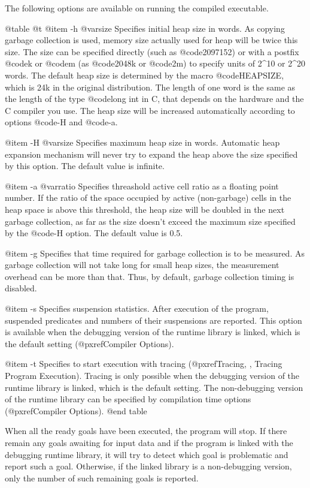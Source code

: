 {{{{The following options are available on running the compiled
executable.

@table @t
@item -h @var{size}
Specifies initial heap size in  words.  As copying garbage collection is
used, memory size actually used for heap will  be twice this  size.  The
size  can be specified  directly  (such  as  @code{2097152}) or  with  a
postfix @code{k} or  @code{m} (as @code{2048k} or @code{2m})  to specify
units of 2^10 or 2^20 words.  The default heap size is determined by the
macro @code{HEAPSIZE},  which is 24k in the original distribution.   The
length of one word is the same as the length of the type @code{long int}
in C, that depends on the hardware and the C compiler you use.  The heap
size will be increased automatically according  to options @code{-H} and
@code{-a}.

@item -H @var{size}
Specifies maximum heap size in words.  Automatic heap expansion
mechanism will never try to expand the heap above the size specified by
this option.  The default value is infinite.

@item -a @var{ratio}
Specifies threashold active cell ratio as a floating point number.  If
the ratio of the space occupied by active (non-garbage) cells in the
heap space is above this threshold, the heap size will be doubled in the
next garbage collection, as far as the size doesn't exceed the maximum
size specified by the @code{-H} option.  The default value is
0.5.

@item -g
Specifies that time required for garbage collection is to be measured.
As garbage collection will not take long for small heap sizes, the
measurement overhead can be more than that.  Thus, by default, garbage
collection timing is disabled.

@item -s
Specifies suspension statistics.  After execution of the program,
suspended predicates and numbers of their suspensions are reported.
This option is available when the debugging version of the runtime
library is linked, which is the default setting (@pxref{Compiler
Options}).

@item -t
Specifies to start execution with tracing (@pxref{Tracing, , Tracing
Program Execution}).  Tracing is only possible when the debugging
version of the runtime library is linked, which is the default setting.
The non-debugging version of the runtime library can be specified by
compilation time options (@pxref{Compiler Options}).
@end table

When all the ready goals have been executed, the program will stop.  If
there remain any goals awaiting for input data and if the program is
linked with the debugging runtime library, it will try to detect which
goal is problematic and report such a goal.  Otherwise, if the linked
library is a non-debugging version, only the number of such remaining
goals is reported.

}}}}
